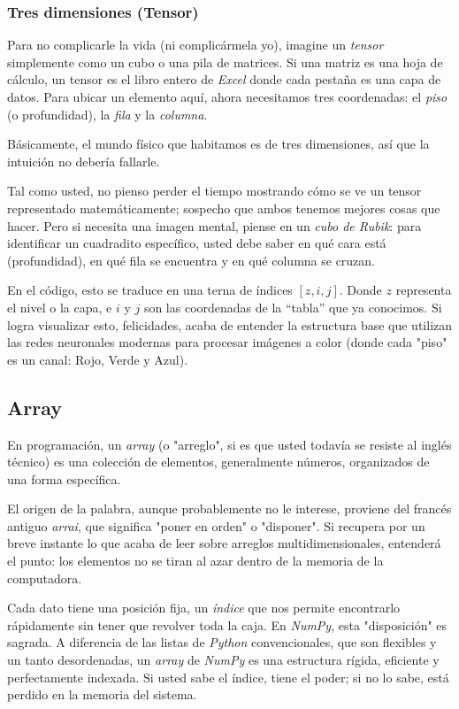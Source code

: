 \subsubsection{Tres dimensiones (Tensor)}

Para no complicarle la vida (ni complicármela yo), imagine un \textit{tensor} simplemente como un cubo o una pila de matrices. Si una matriz es una hoja de cálculo, un tensor es el libro entero de \textit{Excel} donde cada pestaña es una capa de datos. Para ubicar un elemento aquí, ahora necesitamos tres coordenadas: el \textit{piso} (o profundidad), la \textit{fila} y la \textit{columna}.

Básicamente, el mundo físico que habitamos es de tres dimensiones, así que la intuición no debería fallarle.

Tal como usted, no pienso perder el tiempo mostrando cómo se ve un tensor representado matemáticamente; sospecho que ambos tenemos mejores cosas que hacer. Pero si necesita una imagen mental, piense en un \textit{cubo de Rubik}: para identificar un cuadradito específico, usted debe saber en qué cara está (profundidad), en qué fila se encuentra y en qué columna se cruzan.

En el código, esto se traduce en una terna de índices \([z,i,j]\). Donde \(z\) representa el nivel o la capa, e \(i\) y \(j\) son las coordenadas de la ``tabla'' que ya conocimos. Si logra visualizar esto, felicidades, acaba de entender la estructura base que utilizan las redes neuronales modernas para procesar imágenes a color (donde cada "piso" es un canal: Rojo, Verde y Azul).

\subsection{Array}

En programación, un \textit{array} (o "arreglo", si es que usted todavía se resiste al inglés técnico) es una colección de elementos, generalmente números, organizados de una forma específica.

El origen de la palabra, aunque probablemente no le interese, proviene del francés antiguo \textit{arrai}, que significa "poner en orden" o "disponer". Si recupera por un breve instante lo que acaba de leer sobre arreglos multidimensionales, entenderá el punto: los elementos no se tiran al azar dentro de la memoria de la computadora.

Cada dato tiene una posición fija, un \textit{índice} que nos permite encontrarlo rápidamente sin tener que revolver toda la caja. En \textit{NumPy}, esta "disposición" es sagrada. A diferencia de las listas de \textit{Python} convencionales, que son flexibles y un tanto desordenadas, un \textit{array} de \textit{NumPy} es una estructura rígida, eficiente y perfectamente indexada. Si usted sabe el índice, tiene el poder; si no lo sabe, está perdido en la memoria del sistema.

